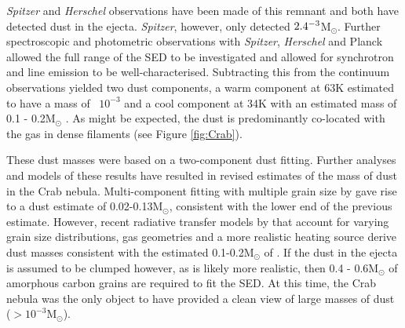 \textit{Spitzer} and \textit{Herschel} observations have been made of this remnant and both have detected dust in the ejecta.  {\em Spitzer}, however, only detected $2.4\time10^{-3}$M$_{\odot}$.  Further spectroscopic and photometric observations with {\em Spitzer}, {\em Herschel} and Planck allowed the full range of the SED to be investigated and allowed for synchrotron and line emission to be well-characterised.  Subtracting this from the continuum observations yielded two dust components, a warm component at 63K estimated to have a mass of ~$10^{-3}$ and a cool component at  34K with an estimated mass of 0.1 - 0.2M$_{\odot}$ \citep{Gomez2012,Temim2012}.  As might be expected, the dust is predominantly co-located with the gas in dense filaments (see Figure \ref{fig:Crab}).
 
 These dust masses were based on a two-component dust fitting.  Further analyses and models of these results have resulted in revised estimates of the mass of dust in the Crab nebula.  Multi-component fitting with multiple grain size by \citet{Temim2013} gave rise to a dust estimate of 0.02-0.13M$_{\odot}$, consistent with the lower end of the previous estimate.  However, recent radiative transfer models by \citet{Owen2015} that account for varying grain size distributions, gas geometries and a more realistic heating source derive dust masses consistent with the estimated 0.1-0.2M$_{\odot}$ of \citet{Gomez2012}.  If the dust in the ejecta is assumed to be clumped however, as is likely more realistic, then 0.4 - 0.6M$_{\odot}$ of amorphous carbon grains are required to fit the SED.  At this time, the Crab nebula was the only object to have provided a clean view of large masses of dust ($>10^{-3}$M$_{\odot}$).
 
